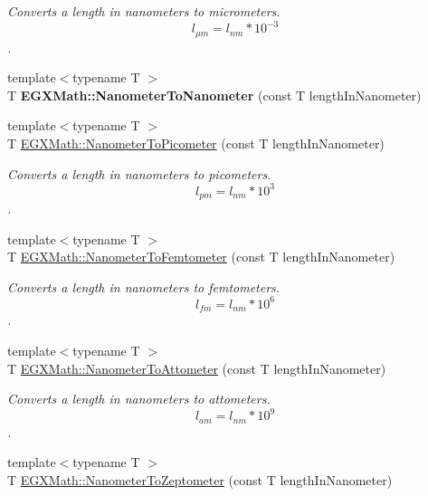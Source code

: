 \begin{DoxyCompactItemize}
\begin{DoxyCompactList}\small\item\em Converts a length in nanometers to micrometers. \[ l_{\mu m}=l_{nm} * 10^{-3} \]. \end{DoxyCompactList}\item 
\mbox{\label{_nanometer_conversion_8inl_a94938f6502431e4f71960a224890ce1a}} 
{\footnotesize template$<$typename T $>$ }\\T {\bfseries E\+G\+X\+Math\+::\+Nanometer\+To\+Nanometer} (const T length\+In\+Nanometer)
\item 
{\footnotesize template$<$typename T $>$ }\\T \mbox{\hyperlink{group___e_g_x_math-_conversions-_length_conversions-_s_i-_nanometer-_s_i_gaba1e9bf91f6e065f8ba8be8dd039b499}{E\+G\+X\+Math\+::\+Nanometer\+To\+Picometer}} (const T length\+In\+Nanometer)
\begin{DoxyCompactList}\small\item\em Converts a length in nanometers to picometers. \[ l_{pm}=l_{nm} * 10^{3} \]. \end{DoxyCompactList}\item 
{\footnotesize template$<$typename T $>$ }\\T \mbox{\hyperlink{group___e_g_x_math-_conversions-_length_conversions-_s_i-_nanometer-_s_i_ga35ac002514f0d8cda8b1fe100b21f54b}{E\+G\+X\+Math\+::\+Nanometer\+To\+Femtometer}} (const T length\+In\+Nanometer)
\begin{DoxyCompactList}\small\item\em Converts a length in nanometers to femtometers. \[ l_{fm}=l_{nm} * 10^{6} \]. \end{DoxyCompactList}\item 
{\footnotesize template$<$typename T $>$ }\\T \mbox{\hyperlink{group___e_g_x_math-_conversions-_length_conversions-_s_i-_nanometer-_s_i_ga6bb90e8a7f98c79dc2ebbb8a46535fe0}{E\+G\+X\+Math\+::\+Nanometer\+To\+Attometer}} (const T length\+In\+Nanometer)
\begin{DoxyCompactList}\small\item\em Converts a length in nanometers to attometers. \[ l_{am}=l_{nm} * 10^{9} \]. \end{DoxyCompactList}\item 
{\footnotesize template$<$typename T $>$ }\\T \mbox{\hyperlink{group___e_g_x_math-_conversions-_length_conversions-_s_i-_nanometer-_s_i_ga3104d856008f94fc14378e95cfbe771f}{E\+G\+X\+Math\+::\+Nanometer\+To\+Zeptometer}} (const T length\+In\+Nanometer)

\end{DoxyCompactItemize}
